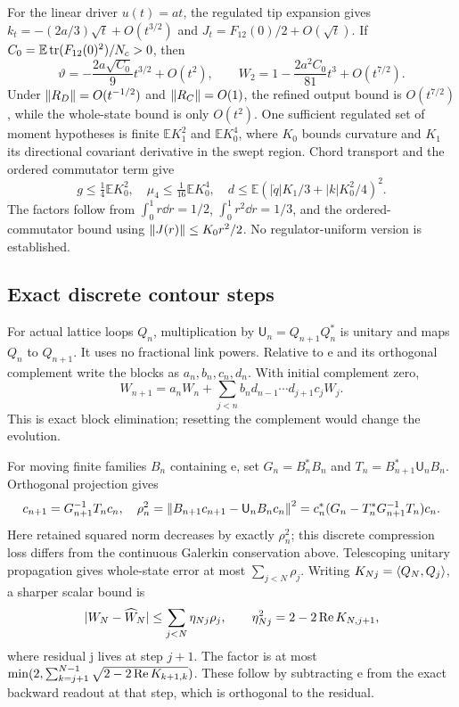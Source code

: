 For the linear driver $u(t)=at$, the regulated tip expansion
gives $k_t=-(2a/3)\sqrt t+O(t^{3/2})$ and
$J_t=F_{12}(0)/2+O(\sqrt t)$. If
$C_0=\mathbb E\operatorname{tr}(F_{12}(0)^2)/N_c>0$, then
\[
\vartheta=-\frac{2a\sqrt{C_0}}9t^{3/2}+O(t^2),\qquad
W_2=1-\frac{2a^2C_0}{81}t^3+O(t^{7/2}).
\]
Under $\left\lVert R_D\right\rVert=O(t^{-1/2})$ and $\left\lVert R_C\right\rVert=O(1)$,
the refined output bound is $O(t^{7/2})$, while the
whole-state bound is only $O(t^2)$.
One sufficient regulated set of moment hypotheses is
finite $\mathbb E K_1^2$ and $\mathbb E K_0^4$, where
$K_0$ bounds curvature and $K_1$ its directional covariant
derivative in the swept region. Chord transport and the
ordered commutator term give
\begin{equation}
g\le\tfrac14\mathbb EK_0^2,\quad
\mu_4\le\tfrac1{16}\mathbb EK_0^4,\quad
d\le\mathbb E\left(|\dot q|K_1/3+|k|K_0^2/4\right)^2.
\end{equation}
The factors follow from $\int_0^1r\dd r=1/2$,
$\int_0^1r^2\dd r=1/3$, and the ordered-commutator
bound using $\left\lVert J(r)\right\rVert\le K_0r^2/2$.
No regulator-uniform version is established.

\subsection{Exact discrete contour steps}
For actual lattice loops $Q_n$, multiplication by
$\mathsf U_n=Q_{n+1}Q_n^*$ is unitary and maps $Q_n$ to
$Q_{n+1}$. It uses no fractional link powers.
Relative to e and its orthogonal complement write the
blocks as $a_n,b_n,c_n,d_n$. With initial complement zero,
\begin{equation}
W_{n+1}=a_nW_n+
\sum_{j<n}b_nd_{n-1}\cdots d_{j+1}c_jW_j .
\end{equation}
This is exact block elimination; resetting the complement
would change the evolution.

For moving finite families $B_n$ containing e, set
$G_n=B_n^*B_n$ and $T_n=B_{n+1}^*\mathsf U_nB_n$.
Orthogonal projection gives
\begin{equation}
c_{n+1}=G_{n+1}^{-1}T_nc_n,\quad
\rho_n^2=\left\lVert B_{n+1}c_{n+1}-\mathsf U_nB_nc_n\right\rVert^2
=c_n^*(G_n-T_n^*G_{n+1}^{-1}T_n)c_n .
\end{equation}
Here retained squared norm decreases by exactly $\rho_n^2$;
this discrete compression loss differs from the continuous
Galerkin conservation above. Telescoping unitary propagation
gives whole-state error at most $\sum_{j<N}\rho_j$.
Writing $K_{Nj}=\left\langle Q_N,Q_j\right\rangle$, a sharper scalar bound is
\begin{equation}
|W_N-\widehat W_N|\le\sum_{j<N}\eta_{Nj}\rho_j,\qquad
\eta_{Nj}^2=2-2\operatorname{Re} K_{N,j+1},
\end{equation}
where residual j lives at step $j+1$.
The factor is at most
$\min(2,\sum_{k=j+1}^{N-1}\sqrt{2-2\operatorname{Re} K_{k+1,k}})$.
These follow by subtracting e from the exact backward
readout at that step, which is orthogonal to the residual.

